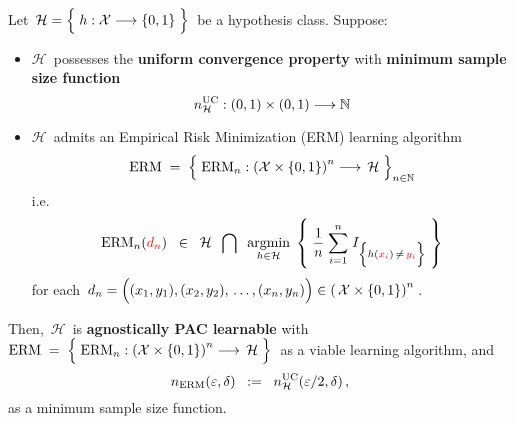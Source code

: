 \vskip 1.0cm
\begin{theorem}
\label{Thm:UCPimpliesAPAC}
\mbox{}\vskip 0.1cm
\noindent
Let
\,$\mathcal{H} = \left\{\; h : \mathcal{X} \overset{{\color{white}-}}{\longrightarrow} \{0,1\} \;\right\}$\,
be a hypothesis class.
\vskip 0.2cm
\noindent
Suppose:
\begin{itemize}
\item
	$\mathcal{H}$\, possesses the \textbf{uniform convergence property}
	with \textbf{minimum sample size function}
	\begin{equation*}
	n^{\textnormal{UC}}_{\mathcal{H}} : (0,1) \times (0,1) \longrightarrow \mathbb{N}
	\end{equation*}
\item
	$\mathcal{H}$\, admits an Empirical Risk Minimization (ERM) learning algorithm
	\begin{equation*}
	\textnormal{ERM} \;=\; \left\{\;
		\overset{{\color{white}.}}{\textnormal{ERM}_{n}} :
		\left(\mathcal{X}\times\{0,1\}\right)^{n} \longrightarrow \, \mathcal{H}
		\;\right\}_{n\in\N}
	\end{equation*}
	i.e.
	\begin{equation*}
	\textnormal{ERM}_{n}({\color{red}d_{n}})
	\;\; \in \;\;
		\mathcal{H}
		\;\; \bigcap \;\;
		\underset{h\in\mathcal{H}}{\argmin}\;\left\{\;
			\dfrac{1}{n}\;\overset{n}{\underset{i=1}{\sum}}\;
			I_{\left\{h({\color{red}x_{i}})\,\overset{{\color{white}.}}{\neq}\,{\color{red}y_{i}}\right\}}
			\;\right\}
	\end{equation*}
	for each
	\,$d_{n} = \left((x_{1},y_{1}),(x_{2},y_{2}),\,\overset{{\color{white}\vert}}{\ldots}\,,(x_{n},y_{n})\right)
	\in \left(\,\mathcal{X} \times \{0,1\} \right)^{n}$\,.
\end{itemize}
Then, \,$\mathcal{H}$\, is \textbf{agnostically PAC learnable} with
\,$\textnormal{ERM} \; = \;
	\left\{\;
		\overset{{\color{white}.}}{\textnormal{ERM}_{n}} :
		\left(\mathcal{X}\times\{0,1\}\right)^{n} \longrightarrow \, \mathcal{H}
		\;\right\}
$\,
as a viable learning algorithm, and
\begin{equation*}
n_{\textnormal{ERM}}(\varepsilon,\delta) \;\; := \;\; n^{\textnormal{UC}}_{\mathcal{H}}(\varepsilon/2,\delta)\,,
\end{equation*}
as a minimum sample size function.
\end{theorem}
\proof

